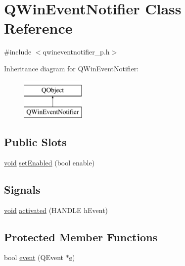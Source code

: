 \hypertarget{class_q_win_event_notifier}{\section{Q\-Win\-Event\-Notifier Class Reference}
\label{class_q_win_event_notifier}
}


{\ttfamily \#include $<$qwineventnotifier\-\_\-p.\-h$>$}

Inheritance diagram for Q\-Win\-Event\-Notifier\-:\begin{figure}[H]
\begin{center}
\leavevmode
\includegraphics[height=2.000000cm]{class_q_win_event_notifier}
\end{center}
\end{figure}
\subsection*{Public Slots}
\begin{DoxyCompactItemize}
\item 
\hyperlink{group___u_a_v_objects_plugin_ga444cf2ff3f0ecbe028adce838d373f5c}{void} \hyperlink{class_q_win_event_notifier_a0e3b99bbb71807303bd5e7006b9baabf}{set\-Enabled} (bool enable)
\end{DoxyCompactItemize}
\subsection*{Signals}
\begin{DoxyCompactItemize}
\item 
\hyperlink{group___u_a_v_objects_plugin_ga444cf2ff3f0ecbe028adce838d373f5c}{void} \hyperlink{class_q_win_event_notifier_a2c2c7af7bee13c76f48d8fba2b2ba2ec}{activated} (H\-A\-N\-D\-L\-E h\-Event)
\end{DoxyCompactItemize}
\subsection*{Protected Member Functions}
\begin{DoxyCompactItemize}
\item 
bool \hyperlink{class_q_win_event_notifier_aac2618814439b3975e970515601a6cd0}{event} (Q\-Event $\ast$\hyperlink{_o_p_plots_8m_a9425be9aab51621e317ba7ade564b570}{e})
\end{DoxyCompactItemize}


